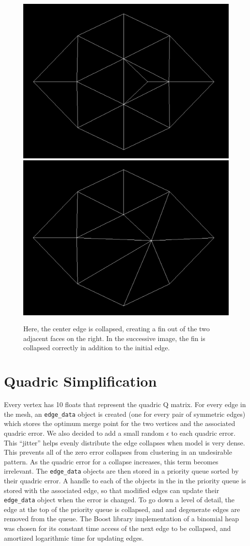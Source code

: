 \documentclass[11pt]{article}
\begin{document}
\begin{figure}
  \begin{center}
    \includegraphics[width=.30\linewidth]{figs/fin1}
    \includegraphics[width=.30\linewidth]{figs/fin2}
  \end{center}

  \caption{Here, the center edge is collapsed, creating a fin out of the two adjacent
  faces on the right. In the successive image, the fin is collapsed correctly in addition
  to the initial edge.}

\end{figure}

\section{Quadric Simplification}

Every vertex has 10 floats that represent the quadric Q matrix. For every edge in the mesh, an \verb`edge_data` object is created (one for every pair of symmetric edges) which stores the optimum merge point for the two vertices and the associated quadric error. We also decided to add a small random $\epsilon$ to each quadric error. This ``jitter'' helps evenly distribute the edge collapses when model is very dense. This prevents all of the zero error collapses from clustering in an undesirable pattern. As the quadric error for a collapse increases, this term becomes irrelevant. The \verb`edge_data` objects are then stored in a priority queue sorted by their quadric error. A handle to each of the objects in the in the priority queue is stored with the associated edge, so that modified edges can update their \verb`edge_data` object when the error is changed. To go down a level of detail, the edge at the top of the priority queue is collapsed, and and degenerate edges are removed from the queue. The Boost library implementation of a binomial heap was chosen for its constant time access of the next edge to be collapsed, and amortized logarithmic time for updating edges.
\end{document}
